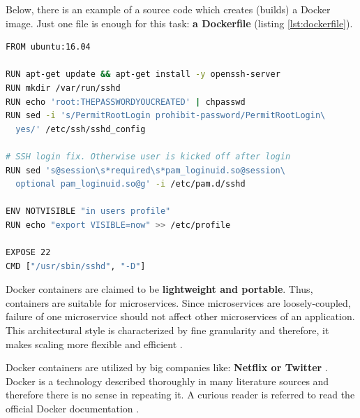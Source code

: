 Below, there is an example of a source code which creates (builds) a Docker image. Just one file is enough for this task: \textbf{a Dockerfile} (listing \ref{lst:dockerfile}).

\begin{lstlisting}[basicstyle=\small,caption={A Dockerfile to build a Docker image with SSH server installed. Based on Docker official documentation \cite{online-docker-doc-bi}},captionpos=b,language=Bash,xleftmargin=0.3cm,label={lst:dockerfile}]
FROM ubuntu:16.04

RUN apt-get update && apt-get install -y openssh-server
RUN mkdir /var/run/sshd
RUN echo 'root:THEPASSWORDYOUCREATED' | chpasswd
RUN sed -i 's/PermitRootLogin prohibit-password/PermitRootLogin\
  yes/' /etc/ssh/sshd_config

# SSH login fix. Otherwise user is kicked off after login
RUN sed 's@session\s*required\s*pam_loginuid.so@session\
  optional pam_loginuid.so@g' -i /etc/pam.d/sshd

ENV NOTVISIBLE "in users profile"
RUN echo "export VISIBLE=now" >> /etc/profile

EXPOSE 22
CMD ["/usr/sbin/sshd", "-D"]
\end{lstlisting}

Docker containers are claimed to be \textbf{lightweight and portable}. Thus, containers are suitable for microservices. Since microservices are loosely-coupled, failure of one microservice should not affect other microservices of an application. This architectural style is characterized by fine granularity and therefore, it makes scaling more flexible and efficient \cite{article-k8s-as-avail}.

Docker containers are utilized by big companies like:  \textbf{Netflix or Twitter} \cite{article-nonf-twitter-netflix}. Docker is a technology described thoroughly in many literature sources and therefore there is no sense in repeating it. A curious reader is referred to read the official Docker documentation \cite{online-docker-doc}.
